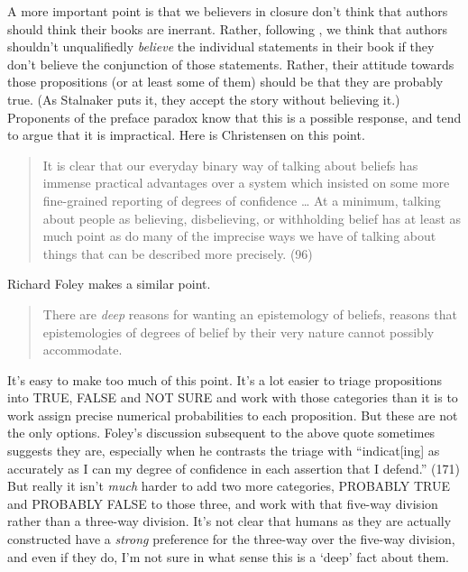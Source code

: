 A more important point is that we believers in closure don't think that authors should think their books are inerrant. Rather, following \cite{Stalnaker1984}, we think that authors shouldn't unqualifiedly \textit{believe} the individual statements in their book if they don't believe the conjunction of those statements. Rather, their attitude towards those propositions (or at least some of them) should be that they are probably true. (As Stalnaker puts it, they accept the story without believing it.) Proponents of the preface paradox know that this is a possible response, and tend to argue that it is impractical. Here is Christensen on this point.

\begin{quote}
It is clear that our everyday binary way of talking about beliefs has immense practical advantages over a system which insisted on some more fine-grained reporting of degrees of confidence {\dots} At a minimum, talking about people as believing, disbelieving, or withholding belief has at least as much point as do many of the imprecise ways we have of talking about things that can be described more precisely. (96)
\end{quote}

\noindent Richard Foley makes a similar point.

\begin{quote}
There are \textit{deep} reasons for wanting an epistemology of beliefs, reasons that epistemologies of degrees of belief by their very nature cannot possibly accommodate. \citep[170, my emphasis]{Foley1993}
\end{quote}

It's easy to make too much of this point. It's a lot easier to triage propositions into TRUE, FALSE and NOT SURE and work with those categories than it is to work assign precise numerical probabilities to each proposition. But these are not the only options. Foley's discussion subsequent to the above quote sometimes suggests they are, especially when he contrasts the triage with ``indicat[ing] as accurately as I can my degree of confidence in each assertion that I defend.'' (171) But really it isn't \textit{much} harder to add two more categories, PROBABLY TRUE and PROBABLY FALSE to those three, and work with that five-way division rather than a three-way division. It's not clear that humans as they are actually constructed have a \textit{strong} preference for the three-way over the five-way division, and even if they do, I'm not sure in what sense this is a `deep' fact about them.

